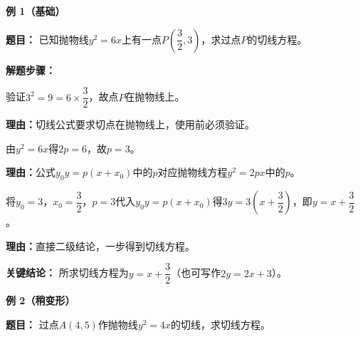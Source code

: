 \begin{examplebox}
	\textbf{\textcolor{CExample}{例 1（基础）}}

	\textbf{\textcolor{CExample}{题目：}}
	已知抛物线$y^2=6x$上有一点$P\left(\dfrac{3}{2},3\right)$，求过点$P$的切线方程。

	\textbf{\textcolor{CExample}{解题步骤：}}
	\begin{description}[style=nextline, leftmargin=2.8em, labelsep=0.5em, itemsep=0.45em]
		\item[\textbf{第一步（验证点在线上）：}] 验证$3^2=9=6\times\dfrac{3}{2}$，故点$P$在抛物线上。
			\par\textbf{理由：}切线公式要求切点在抛物线上，使用前必须验证。
		\item[\textbf{第二步（确定参数）：}] 由$y^2=6x$得$2p=6$，故$p=3$。
			\par\textbf{理由：}公式$y_0 y = p(x+x_0)$中的$p$对应抛物线方程$y^2=2px$中的$p$。
		\item[\textbf{第三步（套用公式）：}] 将$y_0=3$，$x_0=\dfrac{3}{2}$，$p=3$代入$y_0 y = p(x+x_0)$得$3y = 3\left(x+\dfrac{3}{2}\right)$，即$y = x+\dfrac{3}{2}$。
			\par\textbf{理由：}直接二级结论，一步得到切线方程。
	\end{description}

	\textbf{\textcolor{CExample}{关键结论：}}
	所求切线方程为$y = x + \dfrac{3}{2}$（也可写作$2y=2x+3$）。

	\medskip
	\textbf{\textcolor{CExample}{例 2（稍变形）}}

	\textbf{\textcolor{CExample}{题目：}}
	过点$A(4,5)$作抛物线$y^2=4x$的切线，求切线方程。
\begin{center}\end{center}


\end{examplebox}
